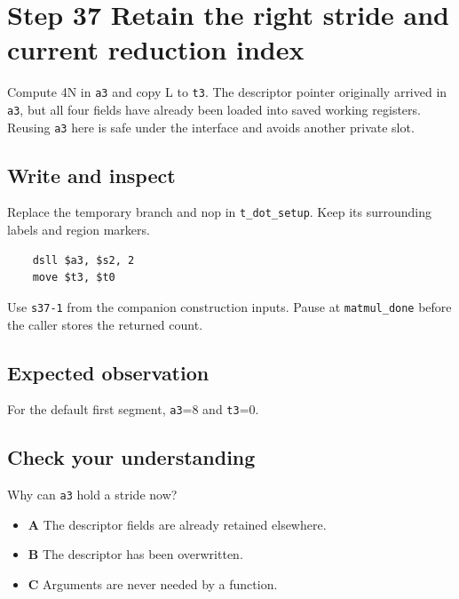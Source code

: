 \section{Step 37 Retain the right stride and current reduction index}\label{matmul-s37}

Compute 4N in \texttt{a3} and copy L to \texttt{t3}. The descriptor pointer originally arrived in \texttt{a3}, but all four fields have already been loaded into saved working registers. Reusing \texttt{a3} here is safe under the interface and avoids another private slot.

\subsection{Write and inspect}
Replace the temporary branch and nop in \texttt{t\_dot\_setup}. Keep its surrounding labels and region markers.

\begin{verbatim}
    dsll $a3, $s2, 2
    move $t3, $t0
\end{verbatim}
Use \texttt{s37-1} from the companion construction inputs. Pause at \texttt{matmul\_done} before the caller stores the returned count.

\subsection{Expected observation}
For the default first segment, \texttt{a3}=8 and \texttt{t3}=0.

\subsection{Check your understanding}
Why can \texttt{a3} hold a stride now?

\begin{itemize}
  \item \textbf{A} The descriptor fields are already retained elsewhere.
  \item \textbf{B} The descriptor has been overwritten.
  \item \textbf{C} Arguments are never needed by a function.
\end{itemize}

